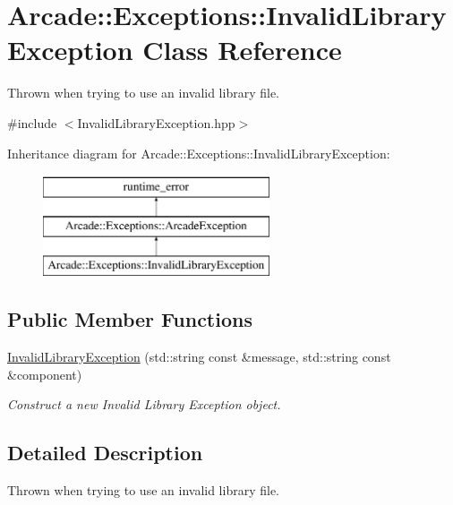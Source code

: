 \hypertarget{classArcade_1_1Exceptions_1_1InvalidLibraryException}{}\section{Arcade\+::Exceptions\+::Invalid\+Library\+Exception Class Reference}
\label{classArcade_1_1Exceptions_1_1InvalidLibraryException}


Thrown when trying to use an invalid library file.  




{\ttfamily \#include $<$Invalid\+Library\+Exception.\+hpp$>$}

Inheritance diagram for Arcade\+::Exceptions\+::Invalid\+Library\+Exception\+:\begin{figure}[H]
\begin{center}
\leavevmode
\includegraphics[height=3.000000cm]{classArcade_1_1Exceptions_1_1InvalidLibraryException}
\end{center}
\end{figure}
\subsection*{Public Member Functions}
\begin{DoxyCompactItemize}
\item 
\mbox{\hyperlink{classArcade_1_1Exceptions_1_1InvalidLibraryException_ae3325fe59ba1cace4e7ef32db01ab790}{Invalid\+Library\+Exception}} (std\+::string const \&message, std\+::string const \&component)
\begin{DoxyCompactList}\small\item\em Construct a new Invalid Library Exception object. \end{DoxyCompactList}\end{DoxyCompactItemize}


\subsection{Detailed Description}
Thrown when trying to use an invalid library file. 

